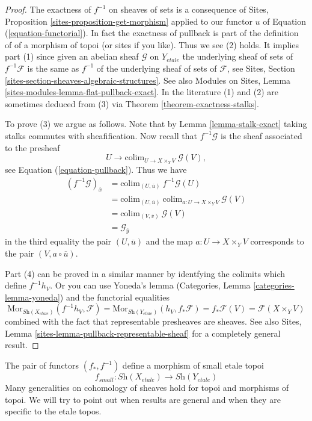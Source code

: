 \begin{proof}
The exactness of $f^{-1}$ on sheaves of sets is a consequence of
Sites, Proposition \ref{sites-proposition-get-morphism}
applied to our functor $u$ of Equation (\ref{equation-functorial}).
In fact the exactness of pullback is part of the definition of
of a morphism of topoi (or sites if you like). Thus we see (2) holds.
It implies part (1) since given an abelian sheaf $\mathcal{G}$ on $Y_{etale}$
the underlying sheaf of sets of $f^{-1}\mathcal{F}$ is the same
as $f^{-1}$ of the underlying sheaf of sets of $\mathcal{F}$, see
Sites, Section \ref{sites-section-sheaves-algebraic-structures}.
See also
Modules on Sites, Lemma \ref{sites-modules-lemma-flat-pullback-exact}.
In the literature (1) and (2) are sometimes deduced from (3) via
Theorem \ref{theorem-exactness-stalks}.

\medskip\noindent
To prove (3) we argue as follows. Note that by
Lemma \ref{lemma-stalk-exact}
taking stalks commutes with sheafification.
Now recall that $f^{-1}\mathcal{G}$ is the sheaf
associated to the presheaf
$$
U \longrightarrow \text{colim}_{U \to X \times_Y V}\ \mathcal{G}(V),
$$
see Equation (\ref{equation-pullback}).
Thus we have
\begin{align*}
(f^{-1}\mathcal{G})_{\overline{x}}
& = \text{colim}_{(U, \overline{u})}\ f^{-1}\mathcal{G}(U) \\
& = \text{colim}_{(U, \overline{u})}
\ \text{colim}_{a : U \to X \times_Y V}\ \mathcal{G}(V) \\
& = \text{colim}_{(V, \overline{v})}\ \mathcal{G}(V) \\
& = \mathcal{G}_{\overline{y}}
\end{align*}
in the third equality the pair $(U, \overline{u})$ and the map
$a : U \to X \times_Y V$ corresponds to the pair $(V, a \circ \overline{u})$.

\medskip\noindent
Part (4) can be proved in a similar manner by identfying the colimits
which define $f^{-1}h_V$. Or you can use
Yoneda's lemma (Categories, Lemma \ref{categories-lemma-yoneda})
and the functorial equalities
$$
\text{Mor}_{\textit{Sh}(X_{etale})}(f^{-1}h_V, \mathcal{F}) =
\text{Mor}_{\textit{Sh}(Y_{etale})}(h_V, f_*\mathcal{F}) =
f_*\mathcal{F}(V) = \mathcal{F}(X \times_Y V)
$$
combined with the fact that representable presheaves are sheaves. See also
Sites, Lemma \ref{sites-lemma-pullback-representable-sheaf}
for a completely general result.
\end{proof}

\noindent
The pair of functors $(f_*, f^{-1})$ define a morphism of small etale topoi
$$
f_{small} :
\textit{Sh}(X_{etale})
\longrightarrow
\textit{Sh}(Y_{etale})
$$
Many generalities on cohomology of sheaves hold for topoi and
morphisms of topoi. We will try to point out when results are
general and when they are specific to the etale topos.

